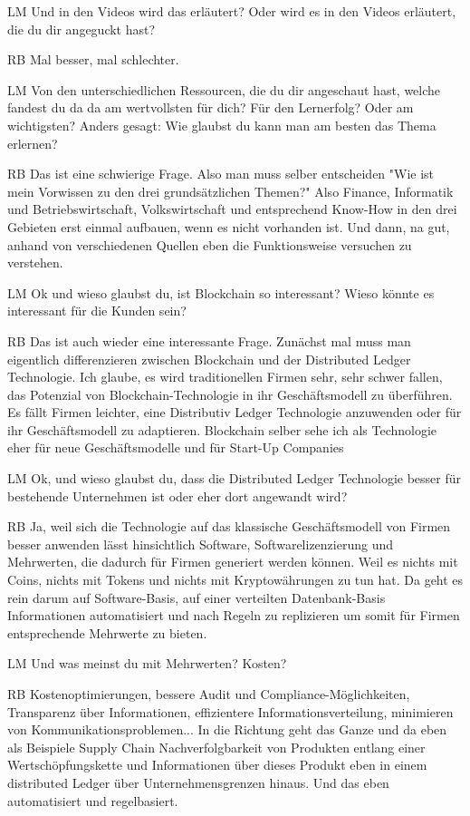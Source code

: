 \begin{xlist}
 \item[LM] Und in den Videos wird das erläutert? Oder wird es in den Videos erläutert, die du dir angeguckt hast?
 \item[RB] Mal besser, mal schlechter.
 \item[LM] Von den unterschiedlichen Ressourcen, die du dir angeschaut hast, welche fandest du da da am wertvollsten für dich? Für den Lernerfolg? Oder am wichtigsten? Anders gesagt: Wie glaubst du kann man am besten das Thema erlernen?
 \item[RB] Das ist eine schwierige Frage.  Also man muss selber entscheiden "Wie ist mein Vorwissen zu den drei grundsätzlichen Themen?" Also Finance, Informatik und Betriebswirtschaft, Volkswirtschaft und entsprechend Know-How in den drei Gebieten erst einmal aufbauen, wenn es nicht vorhanden ist. Und dann, na gut, anhand von verschiedenen Quellen eben die Funktionsweise versuchen zu verstehen.
 \item[LM] Ok und wieso glaubst du, ist Blockchain so interessant? Wieso könnte es interessant für die Kunden sein?
 \item[RB] Das ist auch wieder eine interessante Frage. Zunächst mal muss man eigentlich differenzieren zwischen Blockchain und der Distributed Ledger Technologie. Ich glaube, es wird traditionellen Firmen sehr, sehr schwer fallen, das Potenzial von Blockchain-Technologie in ihr Geschäftsmodell zu überführen. Es fällt Firmen leichter, eine Distributiv Ledger Technologie anzuwenden oder für ihr Geschäftsmodell zu adaptieren. Blockchain selber sehe ich als Technologie eher für neue Geschäftsmodelle und für Start-Up Companies
 \item[LM] Ok, und wieso glaubst du, dass die Distributed Ledger Technologie besser für bestehende Unternehmen ist oder eher dort angewandt wird?
 \item[RB] Ja, weil sich die Technologie auf das klassische Geschäftsmodell von Firmen besser anwenden lässt hinsichtlich Software, Softwarelizenzierung und Mehrwerten, die dadurch für Firmen generiert werden können. Weil es nichts mit Coins, nichts mit Tokens und nichts mit Kryptowährungen zu tun hat. Da geht es rein darum auf Software-Basis, auf einer verteilten Datenbank-Basis Informationen automatisiert und nach Regeln zu replizieren um somit für Firmen entsprechende Mehrwerte zu bieten.
 \item[LM] Und was meinst du mit Mehrwerten? Kosten?
 \item[RB] Kostenoptimierungen, bessere Audit und Compliance-Möglichkeiten, Transparenz über Informationen, effizientere Informationsverteilung, minimieren von Kommunikationsproblemen... In die Richtung geht das Ganze und da eben als Beispiele Supply Chain Nachverfolgbarkeit von Produkten entlang einer Wertschöpfungskette und Informationen über dieses Produkt eben in einem distributed Ledger über Unternehmensgrenzen hinaus. Und das eben automatisiert und regelbasiert.

\end{xlist}
